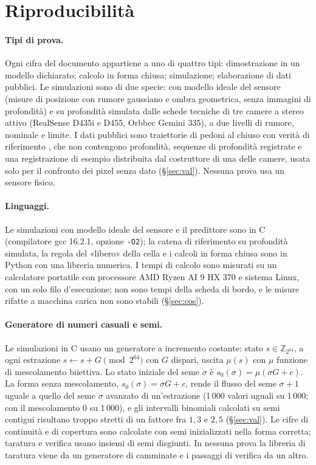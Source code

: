 \section{Riproducibilità}\label{sec:rip}

\paragraph{Tipi di prova.} Ogni cifra del documento appartiene a uno di quattro tipi: dimostrazione in un modello dichiarato; calcolo in forma chiusa; simulazione; elaborazione di dati pubblici. Le simulazioni sono di due specie: con modello ideale del sensore (misure di posizione con rumore gaussiano e ombra geometrica, senza immagini di profondità) e su profondità simulata dalle schede tecniche di tre camere a stereo attivo (RealSense D435i e D455, Orbbec Gemini 335), a due livelli di rumore, nominale e limite. I dati pubblici sono traiettorie di pedoni al chiuso con verità di riferimento \cite{thor}, che non contengono profondità, sequenze di profondità registrate \cite{tum-rgbd,depthtrack} e una registrazione di esempio distribuita dal costruttore di una delle camere, usata solo per il confronto dei pixel senza dato (\S\ref{sec:val}). Nessuna prova usa un sensore fisico.

\paragraph{Linguaggi.} Le simulazioni con modello ideale del sensore e il predittore sono in C (compilatore gcc 16.2.1, opzione \texttt{-O2}); la catena di riferimento su profondità simulata, la regola del «libero» della cella e i calcoli in forma chiusa sono in Python con una libreria numerica. I tempi di calcolo sono misurati su un calcolatore portatile con processore AMD Ryzen AI 9 HX 370 e sistema Linux, con un solo filo d'esecuzione; non sono tempi della scheda di bordo, e le misure rifatte a macchina carica non sono stabili (\S\ref{sec:cos}).

\paragraph{Generatore di numeri casuali e semi.} Le simulazioni in C usano un generatore a incremento costante: stato $s\in\mathbb{Z}_{2^{64}}$, a ogni estrazione $s\leftarrow s+G \pmod{2^{64}}$ con $G$ dispari, uscita $\mu(s)$ con $\mu$ funzione di mescolamento biiettiva. Lo stato iniziale del seme $\sigma$ è $s_0(\sigma)=\mu(\sigma G+c)$. La forma senza mescolamento, $s_0(\sigma)=\sigma G+c$, rende il flusso del seme $\sigma+1$ uguale a quello del seme $\sigma$ avanzato di un'estrazione (1\,000 valori uguali su 1\,000; con il mescolamento 0 su 1\,000), e gli intervalli binomiali calcolati su semi contigui risultano troppo stretti di un fattore fra $1{,}3$ e $2{,}5$ (\S\ref{sec:val}). Le cifre di continuità e di copertura sono calcolate con semi inizializzati nella forma corretta; taratura e verifica usano insiemi di semi disgiunti. In nessuna prova la libreria di taratura viene da un generatore di camminate e i passaggi di verifica da un altro.

